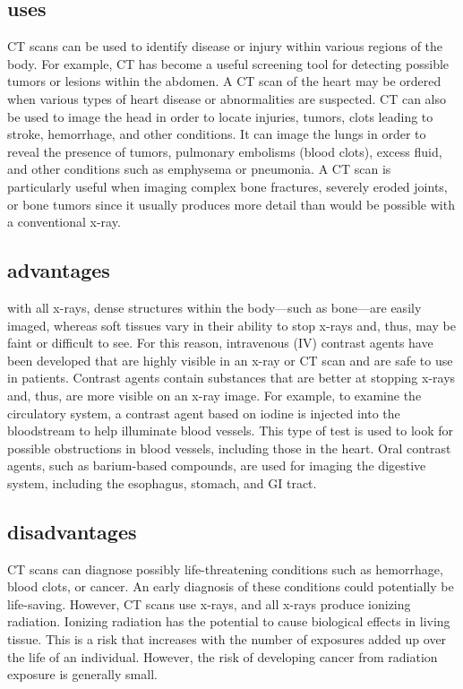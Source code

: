 \documentclass{article}
\begin{document}
\subsection{uses}

CT scans can be used to identify disease or injury within various regions of the body. For example, CT has become a useful screening tool for detecting possible tumors or lesions within the abdomen. A CT scan of the heart may be ordered when various types of heart disease or abnormalities are suspected. CT can also be used to image the head in order to locate injuries, tumors, clots leading to stroke, hemorrhage, and other conditions. It can image the lungs in order to reveal the presence of tumors, pulmonary embolisms (blood clots), excess fluid, and other conditions such as emphysema or pneumonia. A CT scan is particularly useful when imaging complex bone fractures, severely eroded joints, or bone tumors since it usually produces more detail than would be possible with a conventional x-ray.
\clearpage

\subsection{advantages}

with all x-rays, dense structures within the body—such as bone—are easily imaged, whereas soft tissues vary in their ability to stop x-rays and, thus, may be faint or difficult to see. For this reason, intravenous (IV) contrast agents have been developed that are highly visible in an x-ray or CT scan and are safe to use in patients. Contrast agents contain substances that are better at stopping x-rays and, thus, are more visible on an x-ray image. For example, to examine the circulatory system, a contrast agent based on iodine is injected into the bloodstream to help illuminate blood vessels. This type of test is used to look for possible obstructions in blood vessels, including those in the heart. Oral contrast agents, such as barium-based compounds, are used for imaging the digestive system, including the esophagus, stomach, and GI tract.


\subsection{disadvantages}


CT scans can diagnose possibly life-threatening conditions such as hemorrhage, blood clots, or cancer. An early diagnosis of these conditions could potentially be life-saving. However, CT scans use x-rays, and all x-rays produce ionizing radiation. Ionizing radiation has the potential to cause biological effects in living tissue. This is a risk that increases with the number of exposures added up over the life of an individual. However, the risk of developing cancer from radiation exposure is generally small.
\end{document}
